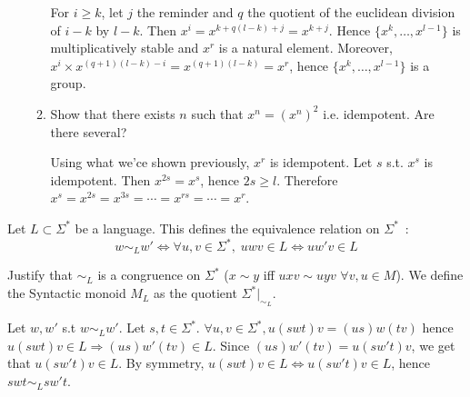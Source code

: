 \documentclass[a4paper,11pt]{exam}
\begin{document}
\begin{questions}
\begin{enumerate}
\begin{enumerate}
          \begin{solution}
            For $i \geq k$, let $j$ the reminder and  $q$ the quotient of the euclidean division of $i -k$ by $l-k$.
            Then $x^i = x^{k+q(l-k)+j} = x^{k+j}$.
            Hence $\{x^k, \dots, x^{l-1}\}$ is multiplicatively stable and
            $x^r$ is a natural element.
            Moreover, $x^i \times x^{(q+1)(l-k)-i}=x^{(q+1)(l-k)}=x^r$, hence 
            $\{x^k, \dots, x^{l-1}\}$ is a group.
          \end{solution}

        \item Show that there exists $n$ such that $x^n=(x^n)^2$ i.e. idempotent. Are there several?

          \begin{solution}
            Using what we'ce shown previously, $x^r$ is idempotent.
            Let $s$ s.t. $x^s$ is idempotent. Then $x^{2s}=x^s$, hence $2s \geq l$.
            Therefore $x^s=x^{2s}=x^{3s}=\cdots=x^{rs}=\cdots=x^r$.
          \end{solution}
      \end{enumerate}
  \end{enumerate}
  Let $L \subset \Sigma^*$ be a language. This defines the equivalence relation on $\Sigma^*$~:
  \[
    w \sim_L w' \Leftrightarrow \forall u, v\in \Sigma^*, \; uwv\in L
    \Leftrightarrow uw'v\in L
  \]

  Justify that $\sim_L $ is a congruence on $\Sigma^*$
  ($x\sim y$ iff $uxv\sim uyv \,\,\forall v,u\in M$).
  We define the Syntactic monoid $M_L$ as the quotient 
  $\Sigma^*|_{\sim_L}$.

  \begin{solution}
    Let $w,w'$ s.t $w \sim_L w'$.
    Let $s,t \in \Sigma^*$.
    $\forall u,v \in \Sigma^*, u(swt)v=(us)w(tv)$ hence
  ${u(swt)v \in L} \Rightarrow (us)w'(tv) \in L$.
    Since $(us)w'(tv)=u(sw't)v$, we get that $u(sw't)v \in L$.
    By symmetry, $u(swt)v \in L \iff u(sw't)v \in L$, hence $swt \sim_L sw't$.
  \end{solution}


\end{questions}
\end{document}
